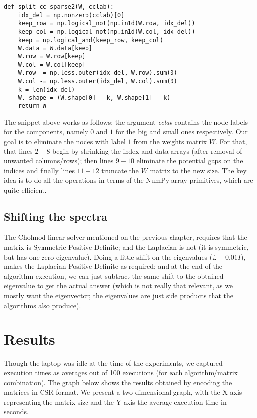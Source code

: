     \begin{lstlisting}
def split_cc_sparse2(W, cclab):
    idx_del = np.nonzero(cclab)[0]
    keep_row = np.logical_not(np.in1d(W.row, idx_del))
    keep_col = np.logical_not(np.in1d(W.col, idx_del))
    keep = np.logical_and(keep_row, keep_col)
    W.data = W.data[keep]
    W.row = W.row[keep]
    W.col = W.col[keep]
    W.row -= np.less.outer(idx_del, W.row).sum(0)
    W.col -= np.less.outer(idx_del, W.col).sum(0)
    k = len(idx_del)
    W._shape = (W.shape[0] - k, W.shape[1] - k)
    return W
    \end{lstlisting}
    \joinbelow{1cm}
    
The snippet above works as follows: the argument
\emph{cclab} contains the node labels for the components, namely $0$ and $1$
for the big and small ones respectively. Our goal is to eliminate the nodes with
label $1$ from the weights matrix $W$. For that, that lines $2-8$
begin by shrinking the index and data arrays (after removal of unwanted
columns/rows); then lines $9-10$ eliminate the potential gaps on the
indices and finally lines $11-12$ truncate the $W$ matrix to the new
size. The key idea is to do all the operations in terms of the NumPy
array primitives, which are quite efficient. 

\subsection{Shifting the spectra}

The \gls{Cholmod} linear solver mentioned on the previous chapter, requires
that the matrix is Symmetric Positive Definite; and the \gls{Laplacian} is
not (it is symmetric, but has
one zero eigenvalue). Doing a little shift on the eigenvalues ($L +
0.01I$), makes the \gls{Laplacian} Positive-Definite as required; and at the
end of the algorithm execution, we can just subtract the same shift to
the obtained eigenvalue to get the actual answer (which is not really
that relevant, as we mostly want the eigenvector; the eigenvalues are
just side products that the algorithms also produce). 

\section{Results}

Though the laptop was idle at the time of the experiments, we captured
execution times as averages out of 100 executions (for each
algorithm/matrix combination). The graph below shows the results
obtained by encoding the matrices in CSR format. We present a
two-dimensional graph, with the X-axis representing the matrix size
and the Y-axis the average execution time in seconds. 

